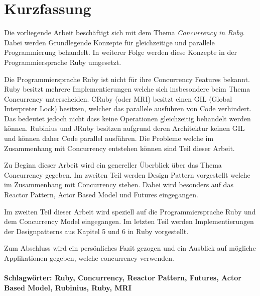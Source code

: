 \section*{Kurzfassung}
\vspace{0.5cm}

Die vorliegende Arbeit beschäftigt sich mit dem Thema \emph{Concurrency in Ruby}. Dabei werden Grundlegende Konzepte für gleichzeitige und parallele Programmierung behandelt. In weiterer Folge werden diese Konzepte in der Programmiersprache Ruby umgesetzt. 

Die Programmiersprache Ruby ist nicht für ihre Concurrency Features bekannt. 
Ruby besitzt mehrere Implementierungen welche sich insbesondere beim Thema Concurrency unterscheiden. CRuby (oder MRI) besitzt einen GIL (Global Interpreter Lock) besitzen, welcher das parallele ausführen von Code verhindert. Das bedeutet jedoch nicht dass keine Operationen gleichzeitig behandelt werden können. Rubinius und JRuby besitzen aufgrund deren Architektur keinen GIL und können daher Code parallel ausführen. Die Probleme welche im Zusammenhang mit Concurrency entstehen können sind Teil dieser Arbeit. 

Zu Beginn dieser Arbeit wird ein genereller Überblick über das Thema Concurrency gegeben. Im zweiten Teil werden Design Pattern vorgestellt welche im Zusammenhang mit Concurrency stehen. Dabei wird besonders auf das Reactor Pattern, Actor Based Model und Futures eingegangen.

Im zweiten Teil dieser Arbeit wird speziell auf die Programmiersprache Ruby und dem Concurrency Model eingegangen. Im letzten Teil werden Implementierungen der Designpatterns aus Kapitel 5 und 6 in Ruby vorgestellt.

Zum Abschluss wird ein persönliches Fazit gezogen und ein Ausblick auf mögliche Applikationen gegeben, welche concurrency verwenden. 


\paragraph{Schlagwörter: Ruby, Concurrency, Reactor Pattern, Futures, Actor Based Model, Rubinius, Ruby, MRI}